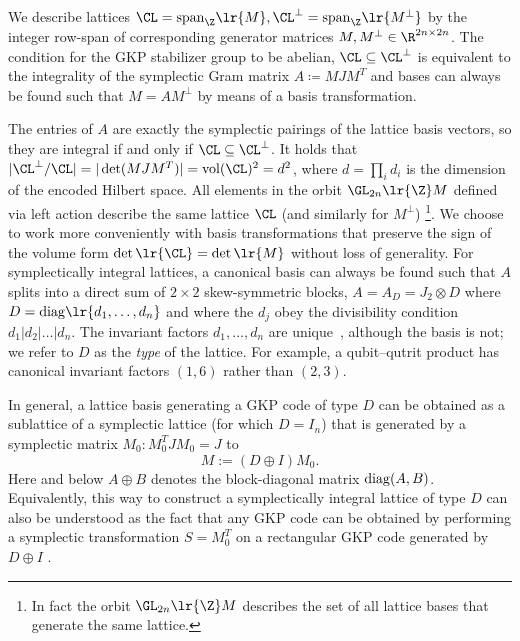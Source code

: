 \documentclass[a4paper, aps, pra, 11pt, onecolumn, tightenlines, superscriptaddress]{revtex4-2}
\begin{document}
We describe lattices $\CL={\rm span}_{\Z}\lr{M}, \CL^{\perp}={\rm span}_{\Z}\lr{M^{\perp}}$ by the integer row-span of corresponding generator matrices $M, M^{\perp} \in \R^{2n \times 2n}$. 
The condition for the GKP stabilizer group to be abelian, $\CL\subseteq \CL^{\perp}$ is equivalent to the integrality of the symplectic Gram matrix $A\coloneqq MJM^T$ and bases can always be found such that $M=AM^{\perp}$ by means of a basis transformation. 

The entries of $A$ are exactly the symplectic pairings of the lattice basis vectors, so they are integral if and only if $\CL\subseteq\CL^{\perp}$. It holds that $|\CL^{\perp}/\CL|=|\det(MJM^T)|=\operatorname{vol}(\CL)^2=d^2$, where $d=\prod_i d_i$ is the dimension of the encoded Hilbert space.
All elements in the orbit $\GL_{2n}\lr{\Z}M$ defined via left action describe the same lattice $\CL$ (and similarly for $M^{\perp}$) \footnote{In fact the orbit $\GL_{2n}\lr{\Z}M$ describes the set of all lattice bases that generate the same lattice.}.
We choose to work more conveniently with basis transformations that preserve the sign of the volume form $\det \lr{\CL}=\det \lr{M}$ without loss of generality.
For symplectically integral lattices, a canonical basis can always be found such that $A$ splits into a direct sum of $2 \times 2$ skew-symmetric blocks, $A=A_D=J_2\otimes D$ where $D={\rm diag} \lr{d_1,\hdots, d_n}$ and where the $d_j$ obey the divisibility condition $d_1 | d_2 | \hdots | d_n$. 
The invariant factors $d_1,\ldots,d_n$ are unique~\cite{Bourbaki9}, although the basis is not; we refer to $D$ as the \textit{type} of the lattice. For example, a qubit--qutrit product has canonical invariant factors $(1,6)$ rather than $(2,3)$.

In general, a lattice basis generating a GKP code of type $D$ can be obtained as a sublattice of a  symplectic lattice (for which $D=I_n$) that is generated by a symplectic matrix $M_0: M_0^TJM_0=J$ to
\begin{equation}
    M:=(D\oplus I) M_0. \label{eq:scaledGKP}
\end{equation}
Here and below $A\oplus B$ denotes the block-diagonal matrix ${\rm diag}(A,B)$. Equivalently, this way to construct a symplectically integral lattice of type $D$ can also be understood as the fact that any GKP code can be obtained by performing a symplectic transformation $S=M_0^T$ on a rectangular GKP code generated by $D\oplus I$ \cite{Conrad_2022}. %
\end{document}
